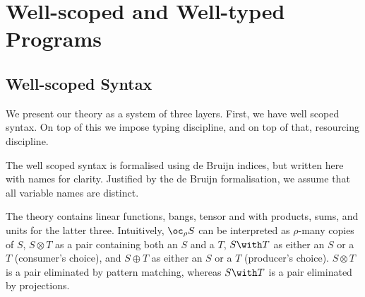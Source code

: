 \documentclass[sigplan,review]{acmart}\settopmatter{printfolios=true,printccs=false,printacmref=false}
\newcommand{\excl}[2]{\oc_{#1} #2}
\newcommand{\tensor}[2]{#1 \otimes #2}
\newcommand{\withT}[2]{#1 \with #2}
\newcommand{\sumT}[2]{#1 \oplus #2}
\begin{document}
\section{Well-scoped and Well-typed Programs}

\subsection{Well-scoped Syntax}

We present our theory as a system of three layers. First, we have well scoped
syntax. On top of this we impose typing discipline, and on top of that,
resourcing discipline.

The well scoped syntax is formalised using de Bruijn indices, but written here
with names for clarity. Justified by the de Bruijn formalisation, we assume that
all variable names are distinct.

The theory contains linear functions, bangs, tensor and with products, sums, and
units for the latter three. Intuitively, $\excl{\rho}{S}$ can be interpreted as
$\rho$-many copies of $S$, $\tensor{S}{T}$ as a pair containing both an $S$ and a
$T$, $\withT{S}{T}$ as either an $S$ or a $T$ (consumer's choice), and
$\sumT{S}{T}$ as either an $S$ or a $T$ (producer's choice). $\tensor{S}{T}$ is
a pair eliminated by pattern matching, whereas $\withT{S}{T}$ is a pair
eliminated by projections.
\end{document}
